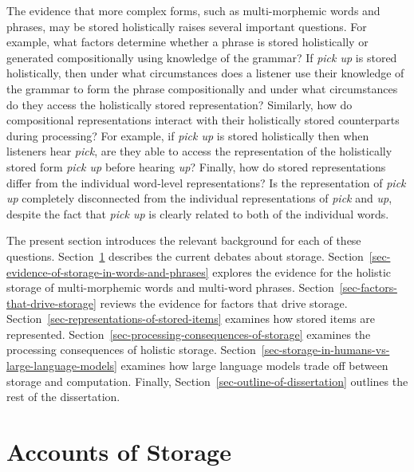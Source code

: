 \documentclass[
  12pt,
  letterpaper,
]{scrreport}
\begin{document}
The evidence that more complex forms, such as multi-morphemic words and
phrases, may be stored holistically raises several important questions.
For example, what factors determine whether a phrase is stored
holistically or generated compositionally using knowledge of the
grammar? If \emph{pick up} is stored holistically, then under what
circumstances does a listener use their knowledge of the grammar to form
the phrase compositionally and under what circumstances do they access
the holistically stored representation? Similarly, how do compositional
representations interact with their holistically stored counterparts
during processing? For example, if \emph{pick up} is stored holistically
then when listeners hear \emph{pick}, are they able to access the
representation of the holistically stored form \emph{pick up} before
hearing \emph{up}? Finally, how do stored representations differ from
the individual word-level representations? Is the representation of
\emph{pick up} completely disconnected from the individual
representations of \emph{pick} and \emph{up}, despite the fact that
\emph{pick up} is clearly related to both of the individual words.

The present section introduces the relevant background for each of these
questions. Section~\ref{sec-accounts-of-storage} describes the current
debates about storage.
Section~\ref{sec-evidence-of-storage-in-words-and-phrases} explores the
evidence for the holistic storage of multi-morphemic words and
multi-word phrases. Section~\ref{sec-factors-that-drive-storage} reviews
the evidence for factors that drive storage.
Section~\ref{sec-representations-of-stored-items} examines how stored
items are represented.
Section~\ref{sec-processing-consequences-of-storage} examines the
processing consequences of holistic storage.
Section~\ref{sec-storage-in-humans-vs-large-language-models} examines
how large language models trade off between storage and computation.
Finally, Section~\ref{sec-outline-of-dissertation} outlines the rest of
the dissertation.

\section{Accounts of Storage}\label{sec-accounts-of-storage}
\end{document}

